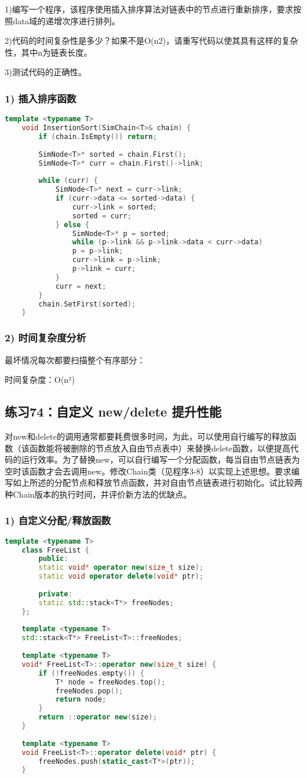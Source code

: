 \documentclass[UTF8]{ctexart}
\begin{document}
1)编写一个程序，该程序使用插入排序算法对链表中的节点进行重新排序，要求按照data域的递增次序进行排列。

2)代码的时间复杂性是多少？如果不是O(n2)，请重写代码以使其具有这样的复杂性，其中n为链表长度。

3)测试代码的正确性。
\subsubsection*{1) 插入排序函数}
\begin{lstlisting}[language=C++]
	template <typename T>
	void InsertionSort(SimChain<T>& chain) {
		if (chain.IsEmpty()) return;
		
		SimNode<T>* sorted = chain.First();
		SimNode<T>* curr = chain.First()->link;
		
		while (curr) {
			SimNode<T>* next = curr->link;
			if (curr->data <= sorted->data) {
				curr->link = sorted;
				sorted = curr;
			} else {
				SimNode<T>* p = sorted;
				while (p->link && p->link->data < curr->data)
				p = p->link;
				curr->link = p->link;
				p->link = curr;
			}
			curr = next;
		}
		chain.SetFirst(sorted);
	}
\end{lstlisting}

\subsubsection*{2) 时间复杂度分析}

最坏情况每次都要扫描整个有序部分：

时间复杂度：O(n²)


\subsection*{练习74：自定义 new/delete 提升性能}
对new和delete的调用通常都要耗费很多时间，为此，可以使用自行编写的释放函数（该函数能将被删除的节点放入自由节点表中）来替换delete函数，以便提高代码的运行效率。为了替换new，可以自行编写一个分配函数，每当自由节点链表为空时该函数才会去调用new。修改Chain类（见程序3-8）以实现上述思想。要求编写如上所述的分配节点和释放节点函数，并对自由节点链表进行初始化。试比较两种Chain版本的执行时间，并评价新方法的优缺点。
\subsubsection*{1) 自定义分配/释放函数}

\begin{lstlisting}[language=C++]
	template <typename T>
	class FreeList {
		public:
		static void* operator new(size_t size);
		static void operator delete(void* ptr);
		
		private:
		static std::stack<T*> freeNodes;
	};
	
	template <typename T>
	std::stack<T*> FreeList<T>::freeNodes;
	
	template <typename T>
	void* FreeList<T>::operator new(size_t size) {
		if (!freeNodes.empty()) {
			T* node = freeNodes.top();
			freeNodes.pop();
			return node;
		}
		return ::operator new(size);
	}
	
	template <typename T>
	void FreeList<T>::operator delete(void* ptr) {
		freeNodes.push(static_cast<T*>(ptr));
	}
\end{lstlisting}
\end{document}
